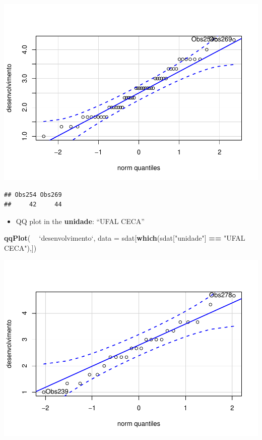 \documentclass[]{article}
\newenvironment{Shaded}{\begin{snugshade}}{\end{snugshade}}
\newcommand{\DataTypeTok}[1]{\textcolor[rgb]{0.13,0.29,0.53}{#1}}
\newcommand{\KeywordTok}[1]{\textcolor[rgb]{0.13,0.29,0.53}{\textbf{#1}}}
\newcommand{\NormalTok}[1]{#1}
\newcommand{\OperatorTok}[1]{\textcolor[rgb]{0.81,0.36,0.00}{\textbf{#1}}}
\newcommand{\StringTok}[1]{\textcolor[rgb]{0.31,0.60,0.02}{#1}}
\providecommand{\tightlist}{%
  \setlength{\itemsep}{0pt}\setlength{\parskip}{0pt}}
\begin{document}
\includegraphics{factorialAnova_files/figure-latex/unnamed-chunk-18-1.pdf}

\begin{verbatim}
## Obs254 Obs269 
##     42     44
\end{verbatim}

\begin{itemize}
\tightlist
\item
  QQ plot in the \textbf{unidade}: ``UFAL CECA''
\end{itemize}

\begin{Shaded}
\begin{Highlighting}[]
\KeywordTok{qqPlot}\NormalTok{( }\OperatorTok{~}\StringTok{ `}\DataTypeTok{desenvolvimento}\StringTok{`}\NormalTok{, }\DataTypeTok{data =}\NormalTok{ sdat[}\KeywordTok{which}\NormalTok{(sdat[}\StringTok{"unidade"}\NormalTok{] }\OperatorTok{==}\StringTok{ "UFAL CECA"}\NormalTok{),])}
\end{Highlighting}
\end{Shaded}

\includegraphics{factorialAnova_files/figure-latex/unnamed-chunk-19-1.pdf}
\end{document}
